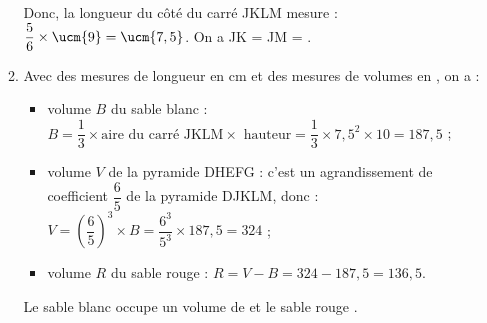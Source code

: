 \begin{corrige}
\begin{enumerate}
\begin{enumerate}
               Donc, la longueur du côté du carré JKLM mesure : $\dfrac56\times\ucm{9}  =\ucm{7,5}$. On a {\blue JK = JM = }.
            \item Avec des mesures de longueur en cm et des mesures de volumes en \ucmc{}, on a :
               \begin{itemize}
                  \item volume $B$ du sable blanc : $B =\dfrac13\times\text{aire du carré JKLM}\times\text{ hauteur} =\dfrac13\times7,5^2\times10 =187,5$ ;
                  \item volume $V$ de la pyramide DHEFG : c'est un agrandissement de coefficient $\dfrac65$ de la pyramide DJKLM, donc : $V =\left(\dfrac65\right)^3\times B =\dfrac{6^3}{5^3}\times187,5 =324$ ; \smallskip
                  \item volume $R$ du sable rouge : $R =V-B =324-187,5 =136,5$.
            \end{itemize}
            {\blue Le sable blanc occupe un volume de  et le sable rouge }.
      \end{enumerate}
   \end{enumerate}
\end{corrige}





